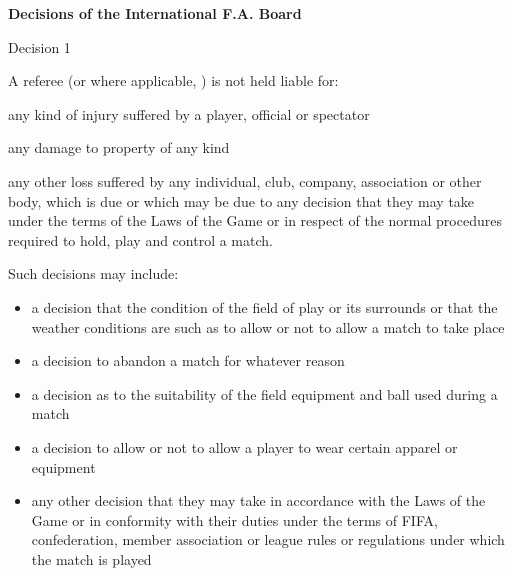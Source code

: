 \clearpage
{\bfseries Decisions of the International F.A. Board }

\headlinebox

Decision 1

A  referee (or where applicable,  ) is not held liable for:

any kind of injury suffered by a player, official or spectator

any damage to property of any kind

any other loss suffered by any individual, club, company, association or other body, which is due or which may be due to any decision that they may take under the terms of the Laws of the Game or in respect of the normal procedures required to hold, play and control a match.

\bigskip

Such decisions may include:

\begin{itemize}
\item a decision that the condition of the field of play or its surrounds or that the weather conditions are such as to allow or not to allow a match to take place
\item a decision to abandon a match for whatever reason
\item a decision as to the suitability of the field equipment and ball used during a match
\item a decision to allow or not to allow a player to wear certain apparel or equipment 
\item any other decision that they may take in accordance with the Laws of the Game or in conformity with their duties under the terms of FIFA, confederation, member association or league rules or regulations under which the match is played 
\end{itemize}

